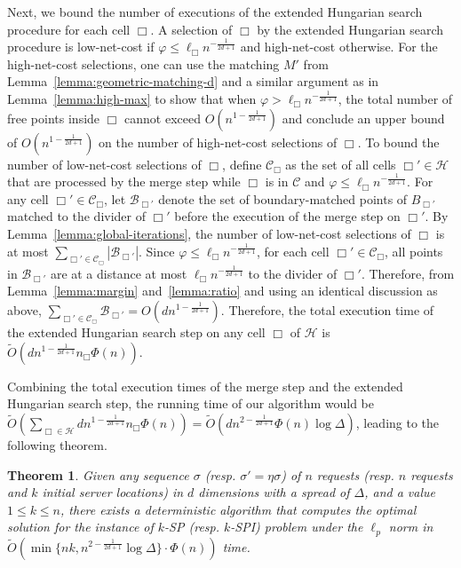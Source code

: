 \documentclass[11pt,onecolumn]{article}
\def\mcB{{\mathcal{B}}}
\def\mcC{{\mathcal{C}}}
\def\mcH{{\mathcal{H}}}
\newcommand{\cell}{\Box}
\newcommand{\servers}{\eta}
\newcommand{\requests}{\sigma}
\newcommand{\ymax}{\varphi}
\newtheorem{theorem}[lemma]{Theorem}
\begin{document}
Next, we bound the number of executions of the extended Hungarian search procedure for each cell $\cell$.
A selection of $\cell$ by the extended Hungarian search procedure is low-net-cost if $\ymax\le \ell_\cell n^{-\frac{1}{2d+1}}$ and high-net-cost otherwise. For the high-net-cost selections, one can use the matching $M'$ from Lemma~\ref{lemma:geometric-matching-d} and a similar argument as in Lemma~\ref{lemma:high-max} to show that when $\ymax> \ell_\cell n^{-\frac{1}{2d+1}}$, the total number of free points inside $\cell$ cannot exceed $O(n^{1-\frac{1}{2d+1}})$ and conclude an upper bound of $O(n^{1-\frac{1}{2d+1}})$ on the number of high-net-cost selections of $\cell$. 
%
%
%
To bound the number of low-net-cost selections of $\cell$, define $\mcC_\cell$ as the set of all cells $\cell'\in\mcH$ that are processed by the merge step while $\cell$ is in $\mcC$ and $\ymax\le \ell_\cell n^{-\frac{1}{2d+1}}$. For any cell $\cell'\in\mcC_\cell$, let $\mcB_{\cell'}$ denote the set of boundary-matched points of $B_{\cell'}$ matched to the divider of $\cell'$ before the execution of the merge step on $\cell'$. By Lemma~\ref{lemma:global-iterations}, the number of low-net-cost selections of $\cell$ is at most $\sum_{\cell'\in\mcC_\cell}|\mcB_{\cell'}|$. Since $\ymax\le \ell_\cell n^{-\frac{1}{2d+1}}$, for each cell $\cell'\in\mcC_\cell$, all points in $\mcB_{\cell'}$ are at a distance at most $\ell_\cell n^{-\frac{1}{2d+1}}$ to the divider of $\cell'$. Therefore, from Lemma~\ref{lemma:margin} and~\ref{lemma:ratio} and using an identical discussion as above, $\sum_{\cell'\in\mcC_\cell}\mcB_{\cell'} = O(dn^{1-\frac{1}{2d+1}})$. Therefore, the total execution time of the extended Hungarian search step on any cell $\cell$ of $\mcH$ is $\tilde{O}(dn^{1-\frac{1}{2d+1}}n_\cell\Phi(n))$. 

Combining the total execution times of the merge step and the extended Hungarian search step, the running time of our algorithm would be $\tilde{O}(\sum_{\cell\in\mcH}dn^{1-\frac{1}{2d+1}}n_\cell\Phi(n)) = \tilde{O}(dn^{2-\frac{1}{2d+1}}\Phi(n)\log\Delta)$, leading to the following theorem.

\begin{theorem}\label{thm:kSP-d}
Given any sequence $\requests$ (resp. $\requests'=\servers\requests$) of $n$ requests (resp. $n$ requests and $k$ initial server locations) in $d$ dimensions with a spread of $\Delta$, and a value $1 \le k \le n$, there exists a deterministic algorithm that computes the optimal solution for the instance of $k$-SP (resp. $k$-SPI) problem under the $\ell_p$ norm in $\tilde{O}(\min\{nk, n^{2-\frac{1}{2d+1}}\log \Delta\}\cdot\Phi(n))$ time.
\end{theorem}
\end{document}
